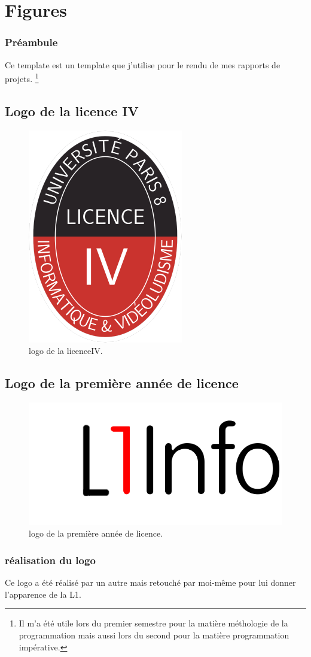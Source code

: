 \documentclass[a4paper, 12pt]{book}
\begin{document}
\chapter{Figures}

\subsection{Préambule}

Ce template est un template que j'utilise pour le rendu de mes rapports de projets. \footnote{ Il m'a été utile lors du premier semestre pour la matière méthologie de la programmation mais aussi lors du second pour la matière programmation impérative.}

\section{Logo de la licence IV}

\begin{figure}[htbp]
  \centering
  \includegraphics[width=0.2\linewidth]{licenceIV.png}
  \caption{logo de la licenceIV.\label{fig-bmp}}
\end{figure}

\section{Logo de la première année de licence}
\begin{figure}[htbp]
  \centering
  \includegraphics[width=0.3\linewidth]{l1info.png}
  \caption{logo de la première année de licence.\label{fig-bmp}}
\end{figure}

\subsection{réalisation du logo}
	Ce logo a été réalisé par un autre mais retouché par moi-même pour lui donner l'apparence de la L1.
\end{document}
